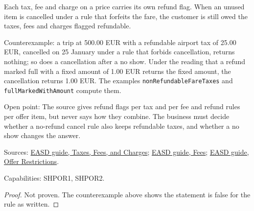 \begin{theorem}
  \label{thm:offers-refundable-taxes}
  Each tax, fee and charge on a price carries its own refund flag. When an
  unused item is cancelled under a rule that forfeits the fare, the customer
  is still owed the taxes, fees and charges flagged refundable.

  Counterexample: a trip at 500.00 EUR with a refundable airport tax of
  25.00 EUR, cancelled on 25 January under a rule that forbids
  cancellation, returns nothing; so does a cancellation after a no show.
  Under the reading that a refund marked full with a fixed amount of
  1.00 EUR returns the fixed amount, the cancellation returns 1.00 EUR. The
  examples \texttt{nonRefundableFareTaxes} and \texttt{fullMarkedWithAmount}
  compute them.

  Open point: The source gives refund flags per tax and per fee and refund
  rules per offer item, but never says how they combine. The business must
  decide whether a no-refund cancel rule also keeps refundable taxes, and
  whether a no show changes the answer.

  Sources: \href{https://standards.atlassian.net/wiki/spaces/EASD/pages/574455915/Taxes+Fees+and+Charges}{EASD guide, Taxes, Fees, and Charges};
  \href{https://standards.atlassian.net/wiki/spaces/EASD/pages/574914636/Fees}{EASD guide, Fees};
  \href{https://standards.atlassian.net/wiki/spaces/EASD/pages/574259692/Offer+Restrictions}{EASD guide, Offer Restrictions}.

  Capabilities: SHPOR1, SHPOR2.
\end{theorem}
\begin{proof}
  Not proven. The counterexample above shows the statement is false for the
  rule as written.
\end{proof}

